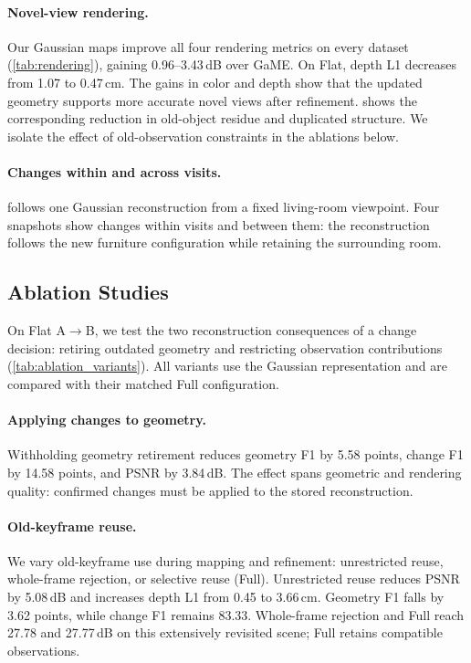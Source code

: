 

\paragraph{Novel-view rendering.}
Our Gaussian maps improve all four rendering metrics on every dataset (\cref{tab:rendering}), gaining
0.96--3.43\,dB over GaME. On Flat, depth L1 decreases from 1.07 to 0.47\,cm. The gains in color and depth
show that the updated geometry supports more accurate novel views after refinement.  shows the corresponding reduction in old-object residue and duplicated structure. We isolate the effect of old-observation constraints in the ablations below.

\paragraph{Changes within and across visits.}
 follows one Gaussian reconstruction from a fixed living-room viewpoint.
Four snapshots show changes within visits and between them: the reconstruction follows the new furniture
configuration while retaining the surrounding room.



\subsection{Ablation Studies}

On Flat A$\rightarrow$B, we test the two reconstruction consequences of a change decision: retiring
outdated geometry and restricting observation contributions (\cref{tab:ablation_variants}). All variants
use the Gaussian representation and are compared with their matched Full configuration.



\paragraph{Applying changes to geometry.}
Withholding geometry retirement reduces geometry F1 by 5.58 points, change F1 by 14.58 points, and PSNR by
3.84\,dB. The effect spans geometric and rendering quality: confirmed changes must be applied to the
stored reconstruction.

\paragraph{Old-keyframe reuse.}
We vary old-keyframe use during mapping and refinement: unrestricted reuse, whole-frame rejection,
or selective reuse (Full). Unrestricted reuse reduces PSNR by 5.08\,dB and increases depth L1 from 0.45
to 3.66\,cm. Geometry F1 falls by 3.62 points, while change F1 remains 83.33.
Whole-frame rejection and Full reach 27.78 and 27.77\,dB on this extensively revisited scene;
Full retains compatible observations.

